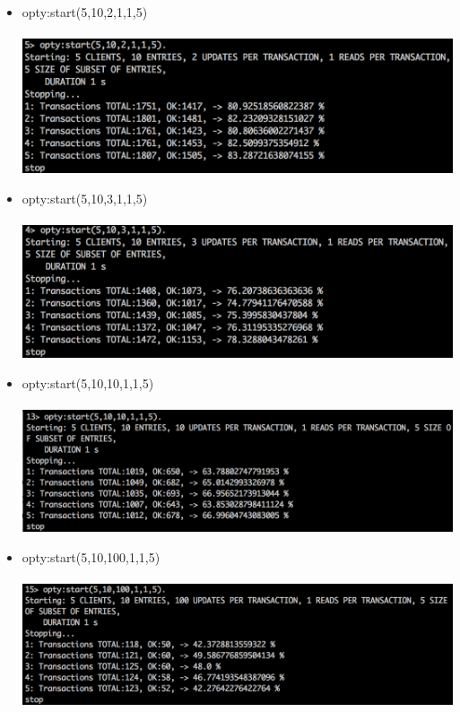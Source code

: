 \documentclass[a4paper, 11pt]{article}
\begin{document}
\begin{itemize}
\item opty:start(5,10,2,1,1,5)\\\\
\includegraphics[scale=0.5]{images/exp-iv-2.png} \\
\item opty:start(5,10,3,1,1,5)\\\\
\includegraphics[scale=0.5]{images/exp-iv-4.png} \\
\item opty:start(5,10,10,1,1,5)\\\\
\includegraphics[scale=0.5]{images/exp-iv-6.png} \\
\item opty:start(5,10,100,1,1,5)\\\\
\includegraphics[scale=0.5]{images/exp-iv-8.png} \\
\end{itemize}
\end{document}

